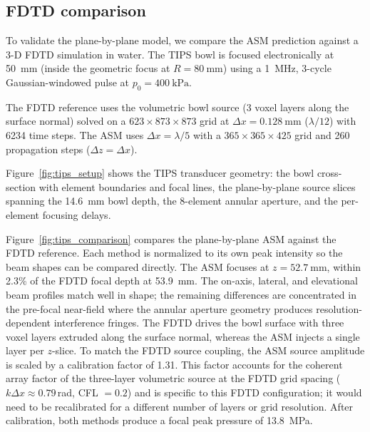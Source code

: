 \documentclass[11pt]{article}
\begin{document}
\subsection{FDTD comparison}
\label{sec:bowl:results}

To validate the plane-by-plane model, we compare the ASM prediction
against a 3-D FDTD simulation in water.  The TIPS bowl is focused
electronically at \SI{50}{\milli\meter} (inside the geometric focus at
$R = \SI{80}{\milli\meter}$) using a \SI{1}{\mega\hertz}, 3-cycle
Gaussian-windowed pulse at $p_0 = \SI{400}{\kilo\pascal}$.

The FDTD reference uses the volumetric bowl source (3 voxel layers
along the surface normal) solved on a $623 \times 873 \times 873$ grid
at $\Delta x = \SI{0.128}{\milli\meter}$ ($\lambda/12$) with 6234 time
steps.  The ASM uses $\Delta x = \lambda/5$ with a
$365 \times 365 \times 425$ grid and 260 propagation steps
($\Delta z = \Delta x$).

Figure~\ref{fig:tips_setup} shows the TIPS transducer geometry: the
bowl cross-section with element boundaries and focal lines, the
plane-by-plane source slices spanning the
\SI{14.6}{\milli\meter} bowl depth, the 8-element annular aperture,
and the per-element focusing delays.

Figure~\ref{fig:tips_comparison} compares the plane-by-plane ASM
against the FDTD reference.  Each method is normalized to its own
peak intensity so the beam shapes can be compared directly.
The ASM focuses at $z = \SI{52.7}{\milli\meter}$, within 2.3\% of
the FDTD focal depth at \SI{53.9}{\milli\meter}.
The on-axis, lateral, and elevational beam profiles match well in
shape; the remaining differences are concentrated in the pre-focal
near-field where the annular aperture geometry produces
resolution-dependent interference fringes.
The FDTD drives the bowl surface with three voxel layers extruded
along the surface normal, whereas the ASM injects a single layer per
$z$-slice.  To match the FDTD source coupling, the ASM source amplitude is scaled
by a calibration factor of 1.31.  This factor accounts for the
coherent array factor of the three-layer volumetric source at the FDTD
grid spacing ($k \Delta x \approx 0.79$\,rad, CFL $= 0.2$) and is
specific to this FDTD configuration; it would need to be recalibrated
for a different number of layers or grid resolution.  After
calibration, both methods produce a focal peak pressure of
\SI{13.8}{\mega\pascal}.
\end{document}
